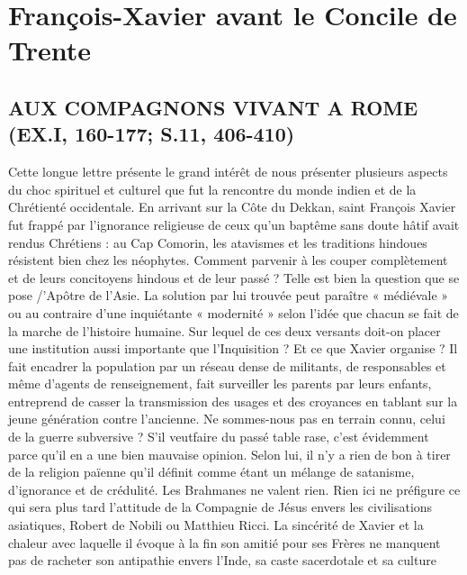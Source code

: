 \chapter{François-Xavier avant le Concile de Trente}

\section{AUX COMPAGNONS VIVANT A ROME
(EX.I, 160-177; S.11, 406-410)}

Cette longue lettre présente le grand intérêt de nous présenter
plusieurs aspects du choc spirituel et culturel que fut la rencontre
du monde indien et de la Chrétienté occidentale. En arrivant sur
la Côte du Dekkan, saint François Xavier fut frappé par l'ignorance
religieuse de ceux qu'un baptême sans doute hâtif avait rendus
Chrétiens : au Cap Comorin, les atavismes et les traditions hindoues résistent bien chez les néophytes. Comment parvenir à les
couper complètement et de leurs concitoyens hindous et de leur
passé ? Telle est bien la question que se pose /'Apôtre de l'Asie.
La solution par lui trouvée peut paraître « médiévale » ou au
contraire d'une inquiétante « modernité » selon l'idée que chacun
se fait de la marche de l'histoire humaine. Sur lequel de ces deux
versants doit-on placer une institution aussi importante que l'Inquisition
? Et ce que Xavier organise ? Il fait encadrer la population
par un réseau dense de militants, de responsables et même d'agents
de renseignement, fait surveiller les parents par leurs enfants, entreprend
de casser la transmission des usages et des croyances en
tablant sur la jeune génération contre l'ancienne. Ne sommes-nous
pas en terrain connu, celui de la guerre subversive ? S'il veutfaire
du passé table rase, c'est évidemment parce qu'il en a une bien
mauvaise opinion. Selon lui, il n'y a rien de bon à tirer de la religion
païenne qu'il définit comme étant un mélange de satanisme,
d'ignorance et de crédulité. Les Brahmanes ne valent rien. Rien ici
ne préfigure ce qui sera plus tard l'attitude de la Compagnie de
Jésus envers les civilisations asiatiques, Robert de Nobili ou Matthieu
Ricci. La sincérité de Xavier et la chaleur avec laquelle il évoque
à la fin son amitié pour ses Frères ne manquent pas de racheter
son antipathie envers l'Inde, sa caste sacerdotale et sa culture

